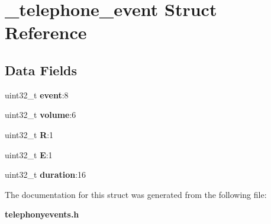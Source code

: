 \section{\+\_\+telephone\+\_\+event Struct Reference}
\label{struct__telephone__event}
\subsection*{Data Fields}
\begin{DoxyCompactItemize}
\item 
\mbox{\label{struct__telephone__event_a22eb482fb7d3213979a308e8735053db}} 
uint32\+\_\+t {\bfseries event}\+:8
\item 
\mbox{\label{struct__telephone__event_a70f1ee2b9c1815c7fff172b0ed53ba8f}} 
uint32\+\_\+t {\bfseries volume}\+:6
\item 
\mbox{\label{struct__telephone__event_a5a815d05eeafdd3e078e3a04c0b1ba66}} 
uint32\+\_\+t {\bfseries R}\+:1
\item 
\mbox{\label{struct__telephone__event_a50c60a506ff5b0f84a3aa916f9a5ec53}} 
uint32\+\_\+t {\bfseries E}\+:1
\item 
\mbox{\label{struct__telephone__event_ad04946837fd18a3d85a269aae1e508f3}} 
uint32\+\_\+t {\bfseries duration}\+:16
\end{DoxyCompactItemize}


The documentation for this struct was generated from the following file\+:\begin{DoxyCompactItemize}
\item 
\textbf{ telephonyevents.\+h}\end{DoxyCompactItemize}
